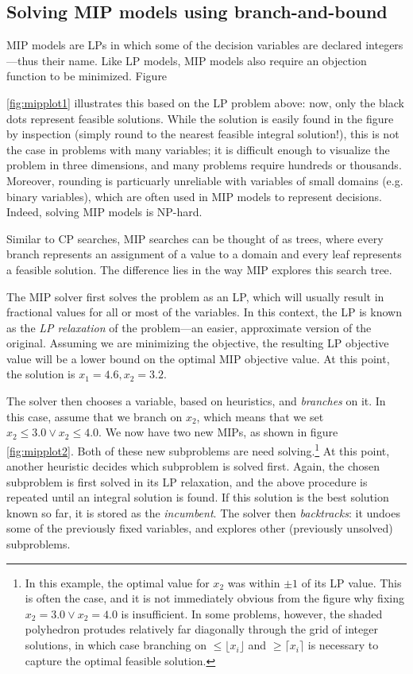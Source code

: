 \documentclass[13pt, letterpaper, oneside]{book}
\begin{document}
\subsection{Solving MIP models using branch-and-bound}
MIP models are LPs in which some of the decision variables are declared
integers---thus their name.  Like LP models, MIP models also require an
objection function to be minimized. Figure

\ref{fig:mipplot1} illustrates this based on the LP problem above: now, only the
black dots represent feasible solutions. While the solution is easily found in
the figure by inspection (simply round to the nearest feasible integral
solution!), this is not the case in problems with many variables; it is
difficult enough to visualize the problem in three dimensions, and many problems
require hundreds or thousands. Moreover, rounding is particuarly unreliable 
with variables of small domains (e.g. binary variables), which are often used in
MIP models to represent decisions. Indeed, solving MIP models is NP-hard.

Similar to CP searches, MIP searches can be thought of as trees, where every
branch represents an assignment of a value to a domain and every leaf represents
a feasible solution. The difference lies in the way MIP explores this search tree.

The MIP solver first solves the problem as an LP, which will usually result in
fractional values for all or most of the variables. In this context, the LP is
known as the \textit{LP relaxation} of the problem---an easier, approximate
version of the original. Assuming we are minimizing the objective, the resulting
LP objective value will be a lower bound on the optimal MIP objective value.
At this point, the solution is $x_1 = 4.6, x_2 = 3.2$.

The solver then chooses a variable, based on heuristics, and \textit{branches}
on it. In this case, assume that we branch on $x_2$, which means that we set
$x_2 \leq 3.0 \lor x_2 \leq 4.0$. We now have two new MIPs, as shown in figure
\ref{fig:mipplot2}. Both of these new subproblems are need solving.\footnote{In
this example, the optimal value for $x_2$ was
within $\pm1$ of its LP value.  This is often the case, and it is not
immediately obvious from the figure why fixing $x_2 = 3.0 \lor x_2 = 4.0$ is
insufficient. In some problems, however, the shaded polyhedron protudes
relatively far diagonally through the grid of integer solutions, in which case
branching on $\leq \lfloor x_i \rfloor$ and $\geq \lceil x_i \rceil$ is
necessary to capture the optimal feasible solution.} At
this point, another heuristic decides which subproblem is solved first.
Again, the chosen subproblem is first solved in its LP relaxation, and the above
procedure is repeated until an integral solution is found. If this solution is
the best solution known so far, it is stored as the \textit{incumbent}. The
solver then \textit{backtracks}: it undoes some of the previously fixed variables,
and explores other (previously unsolved) subproblems.
\end{document}
